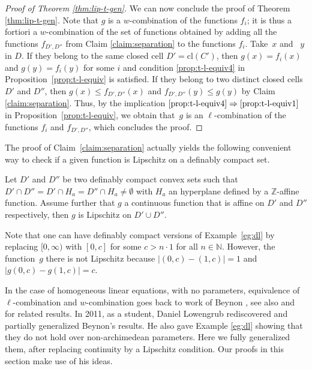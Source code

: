 \documentclass[JEP,XML,SOM,Unicode,ThmDefs,NoEqCountersInSection,published]{cedram}
\let\oldimplies\implies
\renewcommand\implies{\mathchoice{\oldimplies}{\Rightarrow}{\Rightarrow}{\Rightarrow}}
\newcommand{\cl}{\mathrm{cl}}
\newcommand{\N}{\mathbb N}
\newcommand{\Z}{\mathbb Z}
\theoremstyle{plain}
\theoremstyle{definition}
\begin{document}
\begin{proof}[Proof of Theorem \ref{thm:lip-t-gen}]
We can now conclude the proof of Theorem \ref{thm:lip-t-gen}. Note that $g$ is a $w$-combination of the functions $f_i$; it is thus a fortiori a $w$-combination of
the set of functions obtained by adding all the functions $f_{D',D''}$ from Claim \ref{claim:separation} to the functions $f_i$.
Take~$x$ and~ $y$ in $D$. If they belong to the same closed cell $D' = \cl(C')$, then $g (x) = f_i (x)$
and $g (y) = f_i (y)$ for some $i$ and condition \eqref{prop:t-l-equiv4} in Proposition~\ref{prop:t-l-equiv} is satisfied.
If they belong to two distinct closed cells $D'$ and $D''$,
then $g (x) \leq f_{D',D''} (x)$ and $ f_{D',D''} (y) \leq g (y)$ by Claim \ref{claim:separation}.
Thus, by the implication $\eqref{prop:t-l-equiv4}\implies\eqref{prop:t-l-equiv1}$ in
Proposition~\ref{prop:t-l-equiv}, we obtain that~$g$ is an $\ell$-combination of
the functions $f_i$ and $f_{D',D''}$, which concludes the proof.
\end{proof}
The proof of Claim~\ref{claim:separation} actually yields the following convenient way to check if a given function is Lipschitz on a definably compact set.

\begin{coro}
Let $D'$ and $D''$ be two definably compact convex sets such that $D'\cap D''=D'\cap H_a=D''\cap H_a\neq \emptyset$ with $H_a$ an hyperplane defined by a $\Z$-affine function. Assume further that $g$ a continuous function that is affine on $D'$ and $D''$ respectively, then $g$ is Lipschitz on $D'\cup D''$.
\end{coro}

\begin{rema}
Note that one can have definably compact versions of Example~\ref{eg:dl} by replacing $[0,\infty)$ with $[0,c]$ for some $c>n\cdot 1$ for all $n\in \N$. However, the function~$g$ there is not Lipschitz because $|(0,c)-(1,c)|=1$ and $|g(0,c)-g(1,c)|=c$.
\end{rema}

\begin{rema}In the case of homogeneous linear equations, with no parameters, equivalence of $\ell$-combination and $w$-combination goes back to work of Beynon \cite{beynon}, see also \cite[\S5.2]{glass} and \cite{Ovchinnikov} for related results. In 2011, as a student, Daniel Lowengrub rediscovered and partially generalized Beynon's results. He also gave Exam\-ple \ref{eg:dl} showing that they do not hold over non-archimedean parameters. Here we fully generalized them, after replacing continuity by a Lipschitz condition.
Our proofs in this section make use of his ideas.
\end{rema}
\end{document}
